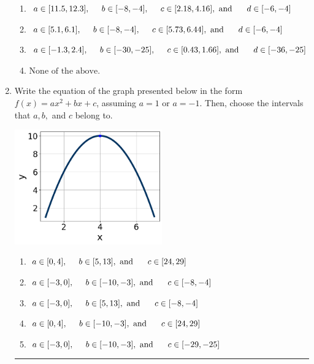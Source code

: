 \documentclass[14pt]{extbook}
\newcommand{\litem}[1]{\item#1\hspace*{-1cm}\rule{\textwidth}{0.4pt}}
\begin{document}
\begin{enumerate}
{\begin{enumerate}[label=\Alph*.]
\item \( a \in [11.5, 12.3], \hspace*{5mm} b \in [-8, -4], \hspace*{5mm} c \in [2.18, 4.16], \text{ and } \hspace*{5mm} d \in [-6, -4] \)
\item \( a \in [5.1, 6.1], \hspace*{5mm} b \in [-8, -4], \hspace*{5mm} c \in [5.73, 6.44], \text{ and } \hspace*{5mm} d \in [-6, -4] \)
\item \( a \in [-1.3, 2.4], \hspace*{5mm} b \in [-30, -25], \hspace*{5mm} c \in [0.43, 1.66], \text{ and } \hspace*{5mm} d \in [-36, -25] \)
\item \( \text{None of the above.} \)

\end{enumerate} }
\litem{
Write the equation of the graph presented below in the form $f(x)=ax^2+bx+c$, assuming  $a=1$ or $a=-1$. Then, choose the intervals that $a, b,$ and $c$ belong to.
\begin{center}
    \includegraphics[width=0.5\textwidth]{../Figures/quadraticGraphToEquationCopyA.png}
\end{center}
\begin{enumerate}[label=\Alph*.]
\item \( a \in [0, 4], \hspace*{5mm} b \in [5, 13], \text{ and } \hspace*{5mm} c \in [24, 29] \)
\item \( a \in [-3, 0], \hspace*{5mm} b \in [-10, -3], \text{ and } \hspace*{5mm} c \in [-8, -4] \)
\item \( a \in [-3, 0], \hspace*{5mm} b \in [5, 13], \text{ and } \hspace*{5mm} c \in [-8, -4] \)
\item \( a \in [0, 4], \hspace*{5mm} b \in [-10, -3], \text{ and } \hspace*{5mm} c \in [24, 29] \)
\item \( a \in [-3, 0], \hspace*{5mm} b \in [-10, -3], \text{ and } \hspace*{5mm} c \in [-29, -25] \)


\end{enumerate}}
\end{enumerate}
\end{document}
